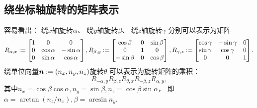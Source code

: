 \subsection{绕坐标轴旋转的矩阵表示}
容易看出：
绕\(x\)轴旋转\(\alpha\)、
绕\(y\)轴旋转\(\beta\)、
绕\(z\)轴旋转\(\gamma\)
分别可以表示为矩阵\begin{equation*}
	R_{\alpha,x}
	:=
	\begin{bmatrix}
		1 & 0 & 0 \\
		0 & \cos\alpha & -\sin\alpha \\
		0 & \sin\alpha & \cos\alpha \\
	\end{bmatrix},
	R_{\beta,y}
	:=
	\begin{bmatrix}
		\cos\beta & 0 & \sin\beta \\
		0 & 1 & 0 \\
		-\sin\beta & 0 & \cos\beta \\
	\end{bmatrix},
	R_{\gamma,z}
	:=
	\begin{bmatrix}
		\cos\gamma & -\sin\gamma & 0 \\
		\sin\gamma & \cos\gamma & 0 \\
		0 & 0 & 1 \\
	\end{bmatrix}.
\end{equation*}
绕单位向量\(\boldsymbol{n} := (n_x,n_y,n_z)\)旋转\(\theta\)
可以表示为旋转矩阵的乘积：\begin{equation*}
	R_{-\alpha,y}
	R_{\beta,z}
	R_{\theta,x}
	R_{-\beta,z}
	R_{\alpha,y},
\end{equation*}
其中\(
	n_x = \cos\beta \cos\alpha,
	n_y = \sin\beta,
	n_z = \cos\beta \sin\alpha
\)，
即\(
	\alpha = \arctan(n_z/n_x),
	\beta = \arcsin n_y
\).

